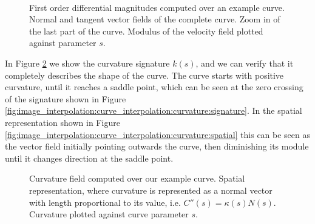 \documentclass{ipol}
\newcommand{\chapFiveDir}{images/chapter_05a}
\begin{document}
\begin{figure}[h]
	\centering
	\\
	\caption{
		First order differential magnitudes computed over an example curve.
		\protect{} Normal and tangent vector fields of the complete curve.
		\protect{} Zoom in of the last part of the curve. 
		\protect{} Modulus of the velocity field plotted against parameter $s$.
	}
	\label{fig:image_interpolation:curve_interpolation:normals}

\end{figure}

In Figure \ref{fig:image_interpolation:curve_interpolation:curvature} we show the curvature signature $k(s)$, and we can verify that it completely describes the shape of the curve. The curve starts with positive curvature, until it reaches a saddle point, which can be seen at the zero crossing of the signature shown in Figure \ref{fig:image_interpolation:curve_interpolation:curvature:signature}. In the spatial representation shown in Figure  \ref{fig:image_interpolation:curve_interpolation:curvature:spatial} this can be seen as the vector field initially pointing outwards the curve, then diminishing its module until it changes direction at the saddle point.

\begin{figure}[h]
	\centering
	\caption{Curvature field computed over our example curve.
		\protect{} Spatial representation, where curvature is represented as a normal vector with length proportional to its value, i.e. $C''(s)=\kappa(s)N(s)$.
		\protect{} Curvature plotted against curve parameter $s$.
	}
	\label{fig:image_interpolation:curve_interpolation:curvature}
\end{figure}
\end{document}

